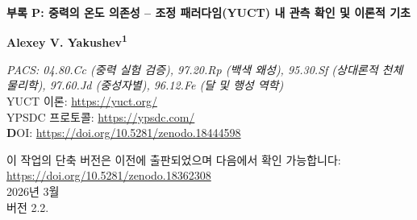 \documentclass[11pt,a4paper]{article}
\newcommand{\Keff}{K_{\mathrm{eff}}}
\newcommand{\eps}{\varepsilon}
\newcommand{\kappac}{\kappa_c}
\begin{document}
	
	\begin{titlepage}
		\centering
		\vspace*{0cm}
		
		\Huge\textbf{부록 P: 중력의 온도 의존성 – 조정 패러다임(YUCT) 내 관측 확인 및 이론적 기초}
		
		\vspace{2.3cm}
		
		\Large\textbf{Alexey V. Yakushev\textsuperscript{1}}
		
		\vspace{0.2cm}
		
		\vspace{1.3cm}
		\large\textit{PACS: 04.80.Cc (중력 실험 검증), 97.20.Rp (백색 왜성), 95.30.Sf (상대론적 천체물리학), 97.60.Jd (중성자별), 96.12.Fe (달 및 행성 역학)} \\
		
		YUCT 이론: \url{https://yuct.org/}\\
		YPSDC 프로토콜: \url{https://ypsdc.com/}\\
		
		\vspace{2cm}
		\textbf DOI: \url{https://doi.org/10.5281/zenodo.18444598}\\
		
		\vspace{1cm}
		
		\large 
		이 작업의 단축 버전은 이전에 출판되었으며 다음에서 확인 가능합니다:\\ \url{https://doi.org/10.5281/zenodo.18362308}\\
		\vspace{1cm}
		2026년 3월 \\ \large 버전 2.2.
		
		\newpage
		\begin{abstract}
			\noindent
			본 연구는 Yakushev 통합 조정 이론(YUCT)에서 도출된 유효 중력 상수의 온도 의존성 가설에 대한 엄밀한 수학적 기초를 제시합니다. 프랙탈 오차 스케일링의 보편 법칙 $\eps = \kappac \alpha \Keff^{-\beta}$ (여기서 $\beta = 0.67 \pm 0.03$은 경험적으로 결정된 지수, $\kappac = 0.33$은 보편 상수)을 사용하여 물질 가열 시 조정 효율 $\Keff$의 변화가 중력장의 변형을 유발함을 보여줍니다. 주요 관측 확인은 SDSS DR1-19 데이터(Crumpler et al., 2024)의 26,041개 백색 왜성에 대한 중력 적색편이 분석에서 비롯되었으며, 고정 반경에서 뜨거운 별들이 체계적으로 더 큰 적색편이를 보이며 통계적 유의성 $>6.1\sigma$를 나타냅니다. 추가 확인은 GRACE 위성 데이터(Rosat et al., 2025)에서 얻어졌으며, 이는 지구 맨틀의 페로브스카이트–후-페로브스카이트 상전이에 의해 발생한 중력 이상을 기록했고, 극도로 강한 자기장을 가진 중성자별인 마그네타 분석(Kaspi \& Beloborodov, 2017)에서도 확인되었습니다. 큐리점까지 가열된 강자성체 근처의 중력 변화를 측정하기 위한 구체적인 실험실 실험이 제안되었으며, 예상 효과는 $\delta g/g \sim 10^{-16}$–$10^{-18}$로 현대 원자 간섭계의 감도 한계에 해당합니다. 얻어진 결과는 중력 상수가 기본 상수가 아니라 물질의 열역학적 상태에 민감한 조정 역학의 발현임을 시사합니다.
		\end{abstract}
		

\end{titlepage}
\end{document}
